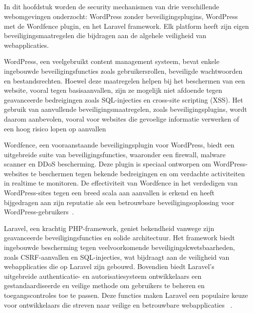\subsection{}
\label{sec:Security mechanismen in Webomgevingen}

In dit hoofdstuk worden de security mechanismen van drie verschillende webomgevingen onderzocht: WordPress zonder beveiligingsplugins, 
WordPress met de Wordfence plugin, en het Laravel framework. Elk platform heeft zijn eigen beveiligingsmaatregelen die bijdragen 
aan de algehele veiligheid van webapplicaties.

WordPress, een veelgebruikt content management systeem, bevat enkele ingebouwde beveiligingsfuncties zoals gebruikersrollen, beveiligde 
wachtwoorden en bestandsrechten. Hoewel deze maatregelen helpen bij het beschermen van een website, vooral tegen basisaanvallen, zijn ze 
mogelijk niet afdoende tegen geavanceerde bedreigingen zoals SQL-injecties en cross-site scripting (XSS). Het gebruik van aanvullende 
beveiligingsmaatregelen, zoals beveiligingsplugins, wordt daarom aanbevolen, vooral voor websites die gevoelige informatie verwerken 
of een hoog risico lopen op aanvallen~\autocite{Trunde2015}

Wordfence, een vooraanstaande beveiligingsplugin voor WordPress, biedt een uitgebreide suite van beveiligingsfuncties, waaronder een 
firewall, malware scanner en DDoS bescherming. Deze plugin is speciaal ontworpen om WordPress-websites te beschermen tegen bekende 
bedreigingen en om verdachte activiteiten in realtime te monitoren. De effectiviteit van Wordfence in het verdedigen van WordPress-sites 
tegen een breed scala aan aanvallen is erkend en heeft bijgedragen aan zijn reputatie als een betrouwbare beveiligingsoplossing voor 
WordPress-gebruikers~\autocite{277144}.

Laravel, een krachtig PHP-framework, geniet bekendheid vanwege zijn geavanceerde beveiligingsfuncties en solide architectuur. Het 
framework biedt ingebouwde bescherming tegen veelvoorkomende beveiligingskwetsbaarheden, zoals CSRF-aanvallen en SQL-injecties, wat 
bijdraagt aan de veiligheid van webapplicaties die op Laravel zijn gebouwd. Bovendien biedt Laravel's uitgebreide authenticatie- en 
autorisatiesysteem ontwikkelaars een gestandaardiseerde en veilige methode om gebruikers te beheren en toegangscontroles toe te passen. 
Deze functies maken Laravel een populaire keuze voor ontwikkelaars die streven naar veilige en betrouwbare webapplicaties
~\autocite{Adamu2020}.

